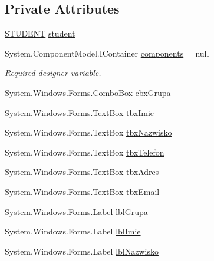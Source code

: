 \subsection*{Private Attributes}
\begin{DoxyCompactItemize}
\item 
\hyperlink{class_dziennik_ocen_1_1_s_t_u_d_e_n_t}{S\+T\+U\+D\+E\+NT} \hyperlink{class_dziennik_ocen_1_1_form_zarzadzaj_studentem_af05f1e588d74d7907c8259468f916dad}{student}
\item 
System.\+Component\+Model.\+I\+Container \hyperlink{class_dziennik_ocen_1_1_form_zarzadzaj_studentem_a541f772925213cefc818120c1b07049e}{components} = null
\begin{DoxyCompactList}\small\item\em Required designer variable. \end{DoxyCompactList}\item 
System.\+Windows.\+Forms.\+Combo\+Box \hyperlink{class_dziennik_ocen_1_1_form_zarzadzaj_studentem_aa214491bf19dacbdff01bcc4d990b590}{cbx\+Grupa}
\item 
System.\+Windows.\+Forms.\+Text\+Box \hyperlink{class_dziennik_ocen_1_1_form_zarzadzaj_studentem_af49d6f5fc0b260c4adf8fc04e648b7de}{tbx\+Imie}
\item 
System.\+Windows.\+Forms.\+Text\+Box \hyperlink{class_dziennik_ocen_1_1_form_zarzadzaj_studentem_afcd8cf8e73a3262cb6f5bd0568be124f}{tbx\+Nazwisko}
\item 
System.\+Windows.\+Forms.\+Text\+Box \hyperlink{class_dziennik_ocen_1_1_form_zarzadzaj_studentem_ab6cac96deb278395b902bbbe671e580e}{tbx\+Telefon}
\item 
System.\+Windows.\+Forms.\+Text\+Box \hyperlink{class_dziennik_ocen_1_1_form_zarzadzaj_studentem_a4e89770014619d2cf01ae4d1051de038}{tbx\+Adres}
\item 
System.\+Windows.\+Forms.\+Text\+Box \hyperlink{class_dziennik_ocen_1_1_form_zarzadzaj_studentem_a159ebcfb51180c03036cefb6115301d8}{tbx\+Email}
\item 
System.\+Windows.\+Forms.\+Label \hyperlink{class_dziennik_ocen_1_1_form_zarzadzaj_studentem_a0b612309ffc8bf140467767bed9e894b}{lbl\+Grupa}
\item 
System.\+Windows.\+Forms.\+Label \hyperlink{class_dziennik_ocen_1_1_form_zarzadzaj_studentem_a9ddbf901bf5e98578df9ed264f83484f}{lbl\+Imie}
\item 
System.\+Windows.\+Forms.\+Label \hyperlink{class_dziennik_ocen_1_1_form_zarzadzaj_studentem_a8989cb2dcf05fabf7648d94e52c1da4f}{lbl\+Nazwisko}

\end{DoxyCompactItemize}
